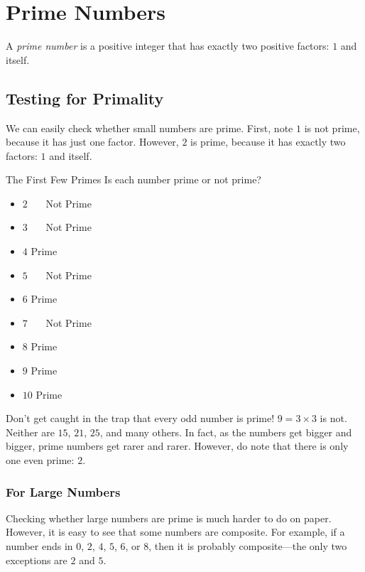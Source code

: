 \documentclass[a4paper,10pt]{report}
\begin{document}
\chapter{Prime Numbers}

A \emph{prime number} is a positive integer that has exactly two positive
factors: $1$ and itself.

\section{Testing for Primality}

We can easily check whether small numbers are prime. First, note $1$ is not
prime, because it has just one factor. However, $2$ is prime, because it has
exactly two factors: $1$ and itself.

\begin{problem}{The First Few Primes}
 Is each number prime or not prime?

 \begin{itemize}
  \item $2$ \hfill {}~~~Not Prime
  \item $3$ \hfill {}~~~Not Prime
  \item $4$ \hfill Prime~~~
  \item $5$ \hfill {}~~~Not Prime
  \item $6$ \hfill Prime~~~
  \item $7$ \hfill {}~~~Not Prime
  \item $8$ \hfill Prime~~~
  \item $9$ \hfill Prime~~~
  \item $10$ \hfill Prime~~~
 \end{itemize}
\end{problem}

Don't get caught in the trap that every odd number is prime! $9=3\times3$ is
not. Neither are $15$, $21$, $25$, and many others. In fact, as the numbers get
bigger and bigger, prime numbers get rarer and rarer. However, do note that
there is only one even prime: $2$.

\subsection{For Large Numbers}

Checking whether large numbers are prime is much harder to do on paper. However,
it is easy to see that some numbers are composite. For example, if a number ends
in $0$, $2$, $4$, $5$, $6$, or $8$, then it is probably composite---the only two
exceptions are $2$ and $5$.
\end{document}
